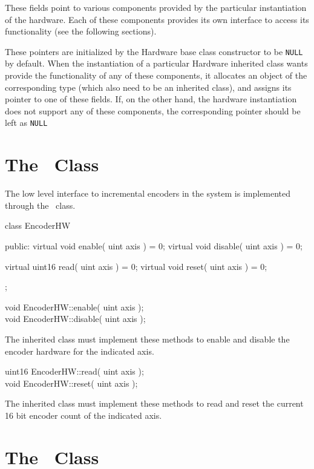 These fields point to various components provided by the particular
instantiation of the hardware. Each of these components provides its own
interface to access its functionality (see the following sections).

These pointers are initialized by the Hardware base class constructor to be
{\tt NULL} by default. When the instantiation of a particular Hardware
inherited class wants provide the functionality of any of these components,
it allocates an object of the corresponding type (which also need to be an
inherited class), and assigns its pointer to one of these fields. If, on the
other hand, the hardware instantiation does not support any of these
components, the corresponding pointer should be left as {\tt NULL}

\section{The \EncoderHW\ Class}
\label{sec:encoder_class}

The low level interface to incremental encoders in the system is implemented 
through the \EncoderHW\ class. 

\begin{classdef}
class EncoderHW {
public:
  virtual void   enable( uint axis ) = 0;
  virtual void   disable( uint axis ) = 0;

  virtual uint16 read( uint axis ) = 0;
  virtual void   reset( uint axis ) = 0;
};
\end{classdef}

\begin{prototype}
void EncoderHW::enable( uint axis ); \\
void EncoderHW::disable( uint axis );
\end{prototype}

The inherited class must implement these methods to enable and disable the
encoder hardware for the indicated axis.

\begin{prototype}
uint16 EncoderHW::read( uint axis ); \\
void   EncoderHW::reset( uint axis );
\end{prototype}

The inherited class must implement these methods to read and reset the
current 16 bit encoder count of the indicated axis.

\section{The \AnalogHW\ Class}
\label{sec:analog_class}

